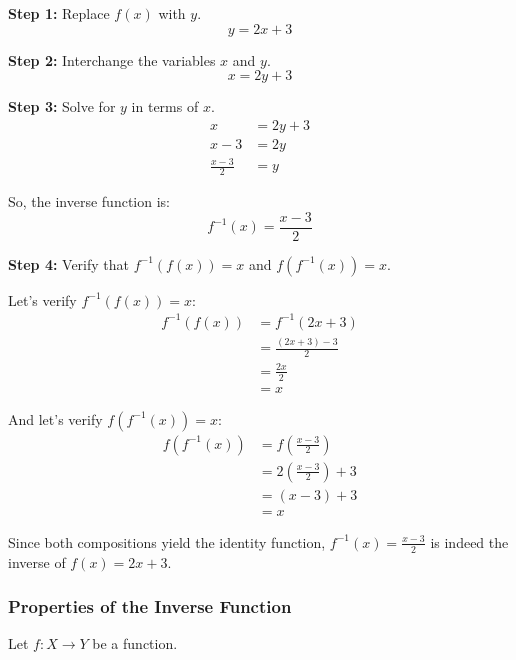 \textbf{Step 1:} Replace $f (x)$ with $y$.
\[
	y = 2x + 3
\]

\textbf{Step 2:} Interchange the variables $x$ and $y$.
\[
	x = 2y + 3
\]

\textbf{Step 3:} Solve for $y$ in terms of $x$.
\begin{align}
	x               & = 2y + 3 \\
	x - 3           & = 2y     \\
	\frac{x - 3}{2} & = y
\end{align}

So, the inverse function is:
\[
	f^{-1}(x) = \frac{x - 3}{2}
\]

\textbf{Step 4:} Verify that $f^{-1} (f (x)) = x$ and $f(f^{-1} (x)) = x$.

Let's verify $f^{-1} (f (x)) = x$:
\begin{align}
	f^{-1}(f(x)) & = f^{-1}(2x + 3)         \\
	             & = \frac{(2x + 3) - 3}{2} \\
	             & = \frac{2x}{2}           \\
	             & = x
\end{align}

And let's verify $f(f^{-1}(x)) = x$:
\begin{align}
	f(f^{-1}(x)) & = f\left(\frac{x - 3}{2}\right)     \\
	             & = 2\left(\frac{x - 3}{2}\right) + 3 \\
	             & = (x - 3) + 3                       \\
	             & = x
\end{align}

Since both compositions yield the identity function, $f^{-1} (x) = \frac{x - 3}{2}$ is indeed the inverse of $f (x) = 2x + 3$.


\subsubsection{Properties of the Inverse Function}
Let $f:X\rightarrow Y$ be a function.


